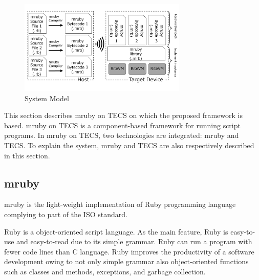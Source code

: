 \documentclass[conference,compsoc]{IEEEtran}
\begin{document}
\begin{figure}[t]
    \centering
    \includegraphics[width=8cm,clip]{figure/proposed.pdf}
    \caption{System Model}
    \label{fig:proposed}
\end{figure}

This section describes mruby on TECS on which the proposed framework is based.
mruby on TECS is a component-based framework for running script programs.
In mruby on TECS, two technologies are integrated: mruby and TECS.
To explain the system, mruby and TECS are also respectively described in this section.

\subsection{mruby}
\label{sec:mruby}
mruby is the light-weight implementation of Ruby programming language complying to part of the ISO standard.

Ruby is a object-oriented script language.
As the main feature, Ruby is easy-to-use and easy-to-read due to its simple grammar.
Ruby can run a program with fewer code lines than C language.
Ruby improves the productivity of a software development owing to not only simple grammar also object-oriented functions such as classes and methods, exceptions, and garbage collection.
\end{document}
